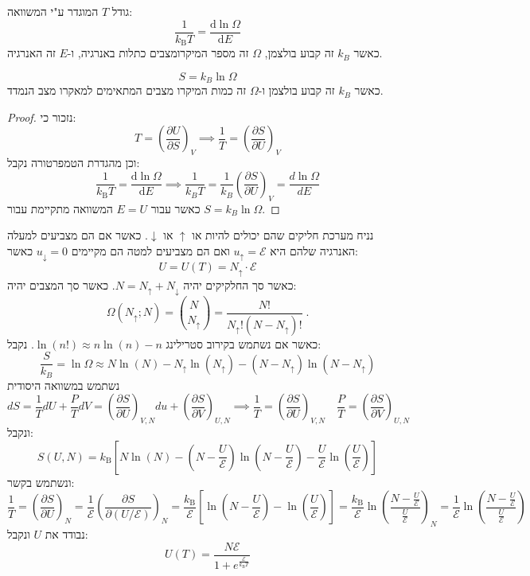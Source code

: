 \documentclass{tstextbook}
\begin{document}
\begin{definition}[טמפרטורה]
גודל \(T\) המוגדר ע"י המשוואה:
$${\frac{1}{k_{\mathrm{B}}T}}={\frac{\mathrm{d}\ln\Omega}{\mathrm{d}E}}$$
כאשר \(k_{B}\) זה קבוע בולצמן, \(\Omega\) זה מספר המיקרומצבים כתלות באנרגיה, ו-\(E\) זה האנרגיה.

\end{definition}
\begin{proposition}
$$S=k_{B}\ln \Omega$$
כאשר \(k_{B}\) זה קבוע בולצמן ו-\(\Omega\) זה כמות המיקרו מצבים המתאימים למאקרו מצב הנמדד. 

\end{proposition}
\begin{proof}
נזכור כי:
$$T=\left({\frac{\partial U}{\partial S}}\right)_{V}\implies {\frac{1}{T}}=\left({\frac{\partial S}{\partial U}}\right)_{V}$$
וכן מהגדרת הטמפרטורה נקבל:
$${\frac{1}{k_{\mathrm{B}}T}}={\frac{\mathrm{d}\ln\Omega}{\mathrm{d}E}}\implies \frac{1}{k_{B}T}=\frac{1}{k_{B}}\left( \frac{\partial S}{\partial U} \right)_{V}=\frac{d\ln \Omega}{dE} $$
כאשר עבור \(E=U\) המשוואה מתקיימת עבור \(S=k_{B}\ln \Omega\).

\end{proof}
\begin{example}
נניח מערכת חליקים שהם יכולים להיות או \(\uparrow\) או \(\downarrow\). כאשר אם הם מצביעים למעלה האנרגיה שלהם היא \(u_{\uparrow}=\mathcal{E}\) ואם הם מצביעים למטה הם מקיימים \(u_{\downarrow}=0\) כאשר:
$$U=U(T)=N_{\uparrow}\cdot\mathcal{E}$$
כאשר סך החלקיקים יהיה \(N=N_{\uparrow}+N_{\downarrow}\). כאשר סך המצבים יהיה:
$$\Omega\left(N_{\uparrow};N\right)={\binom{N}{N_{\uparrow}}}=\frac{N!}{N_{\uparrow}!\left(N-N_{\uparrow}\right)!}\;.$$
כאשר אם נשתמש בקירוב סטרילינג \(\ln(n!)\approx n\ln(n)-n\). נקבל:
$$\frac{S}{k_{B}}=\ln \Omega \approx N\ln\left(N\right)-N_{\uparrow}\ln\left(N_{\uparrow}\right)-\left(N-N_{\uparrow}\right)\ln\left(N-N_{\uparrow}\right)$$
נשתמש במשוואה היסודית
$$dS = \frac{1}{T}dU+ \frac{P}{T}dV=\left( \frac{\partial S}{\partial U}  \right)_{V,N}du+\left( \frac{\partial S}{\partial V}  \right)_{U,N}\implies \frac{1}{T}=\left( \frac{\partial S}{\partial U}  \right)_{V,N}\quad \frac{P}{T}=\left( \frac{\partial S}{\partial V}  \right)_{U,N}$$
ונקבל:
$$S\left(U,N\right)=k_{\mathrm{B}}\left[N\ln\left(N\right)-\left(N-\frac{U}{\mathcal{E}}\right)\ln\left(N-\frac{U}{\mathcal{E}}\right)-\frac{U}{\mathcal{E}}\ln\left(\frac{U}{\mathcal{E}}\right)\right]$$
ונשתמש בקשר:
$$
{\frac{1}{T}}=\left({\frac{\partial S}{\partial U}}\right)_{N}={\frac{1}{\mathcal{E}}}\left({\frac{\partial S}{\partial\left(U/\mathcal{E}\right)}}\right)_{N}={\frac{k_{\mathrm{B}}}{\mathcal{E}}}\left[\ln\left(N-{\frac{U}{\mathcal{E}}}\right)-\ln\left({\frac{U}{\mathcal{E}}}\right)\right]={\frac{k_{\mathrm{B}}}{\mathcal{E}}}\ln\left({\frac{N-{\frac{U}{\mathcal{E}}}}{{\frac{U}{\mathcal{E}}}}}\right)_{N}={\frac{1}{\mathcal{E}}}\ln\left({\frac{N-{\frac{U}{\mathcal{E}}}}{{\frac{U}{\mathcal{E}}}}}\right)$$
נבודד את \(U\) ונקבל:
$$U\left(T\right)=\frac{N\mathcal{E}}{1+e^{\frac{\mathcal{E}}{k_{\mathrm{B}}T}}}$$

\end{example}
\end{document}
